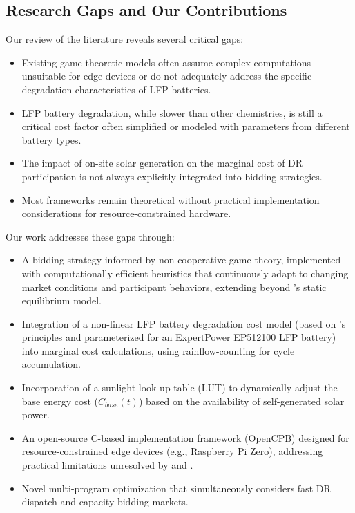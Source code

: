 \documentclass[11pt,a4paper]{article}
\begin{document}
\subsection{Research Gaps and Our Contributions}
Our review of the literature reveals several critical gaps:
\begin{itemize}
    \item Existing game-theoretic models often assume complex computations unsuitable for edge devices or do not adequately address the specific degradation characteristics of LFP batteries.
    \item LFP battery degradation, while slower than other chemistries, is still a critical cost factor often simplified or modeled with parameters from different battery types.
    \item The impact of on-site solar generation on the marginal cost of DR participation is not always explicitly integrated into bidding strategies.
    \item Most frameworks remain theoretical without practical implementation considerations for resource-constrained hardware.
\end{itemize}

Our work addresses these gaps through:
\begin{itemize}
    \item A bidding strategy informed by non-cooperative game theory, implemented with computationally efficient heuristics that continuously adapt to changing market conditions and participant behaviors, extending beyond \citet{Nekouei2015}'s static equilibrium model.
    \item Integration of a non-linear LFP battery degradation cost model (based on \citet{Millner2010}'s principles and parameterized for an ExpertPower EP512100 LFP battery) into marginal cost calculations, using rainflow-counting for cycle accumulation.
    \item Incorporation of a sunlight look-up table (LUT) to dynamically adjust the base energy cost ($C_{base}(t)$) based on the availability of self-generated solar power.
    \item An open-source C-based implementation framework (OpenCPB) designed for resource-constrained edge devices (e.g., Raspberry Pi Zero), addressing practical limitations unresolved by \citet{Iria2019} and \citet{Lakshmanan2021}.
    \item Novel multi-program optimization that simultaneously considers fast DR dispatch and capacity bidding markets.
\end{itemize}
\end{document}
